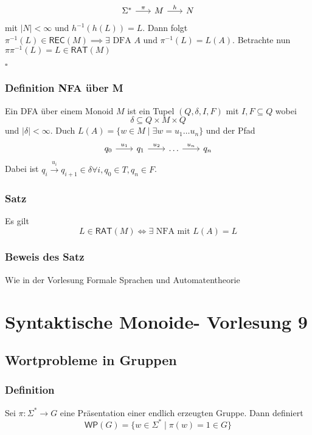\documentclass[12pt, german]{article}
\newcommand{\sigstern}{\Sigma^\ast}
\newcommand{\inv}{^{-1}}
\newcommand{\rat}{\mathsf{RAT}}
\newcommand{\rec}{\mathsf{REC}}
\newcommand{\wop}{\mathsf{WP}}
\newcommand{\bewiesen}{
	
	\begin{flushright}
		$\square$  \\
\end{flushright}}
\begin{document}
	\begin{equation*}
		\begin{tikzcd}[column sep=1.5pc]
			\sigstern \arrow{r}{\pi} & M \arrow{r}{h} & N 
		\end{tikzcd}
	\end{equation*}
	mit $|N| < \infty$ und $h\inv(h(L)) = L$. Dann folgt $\pi\inv(L) \in \rec(M) \implies \exists \text{ DFA } A \text{ und } \pi\inv(L) = L(A)$. Betrachte nun $\pi\pi\inv(L) = L \in \rat(M)$
	\bewiesen
	
	\subsubsection{Definition NFA über M}
	Ein DFA über einem Monoid $M$ ist ein Tupel $(Q, \delta, I, F)$ mit $I, F \subseteq Q$ wobei $$\delta \subseteq Q \times M \times Q$$ und $|\delta| < \infty$. 
	Duch $L(A) = \{w \in M \mid \exists w = u_1 \ldots u_n\}$ und der Pfad 
	\begin{equation*}
		\begin{tikzcd}[column sep=1.7pc]
			q_0\arrow{r}{u_1} &  q_1 \arrow{r}{u_2} & \ldots \arrow{r}{u_n} & q_n
		\end{tikzcd}
	\end{equation*}
	Dabei ist $q_i \overset{u_i}{\longrightarrow } q_{i+1} \in \delta \forall i, q_0 \in T, q_n \in F$.
	
	\subsubsection{Satz}
	Es gilt $$ L \in \rat(M) \iff \exists \text{ NFA mit } L(A) = L $$
	
	\subsubsection{Beweis des Satz}
	Wie in der Vorlesung Formale Sprachen und Automatentheorie
	
	\section{Syntaktische Monoide- Vorlesung 9}
	\subsection{Wortprobleme in Gruppen}
	\subsubsection{Definition}
	Sei $\pi : \sigstern \to G$ eine Präsentation einer endlich erzeugten Gruppe. Dann definiert $$\wop(G) = \{ w \in \sigstern \mid \pi(w)=1 \in G\}$$
	
\end{document}
